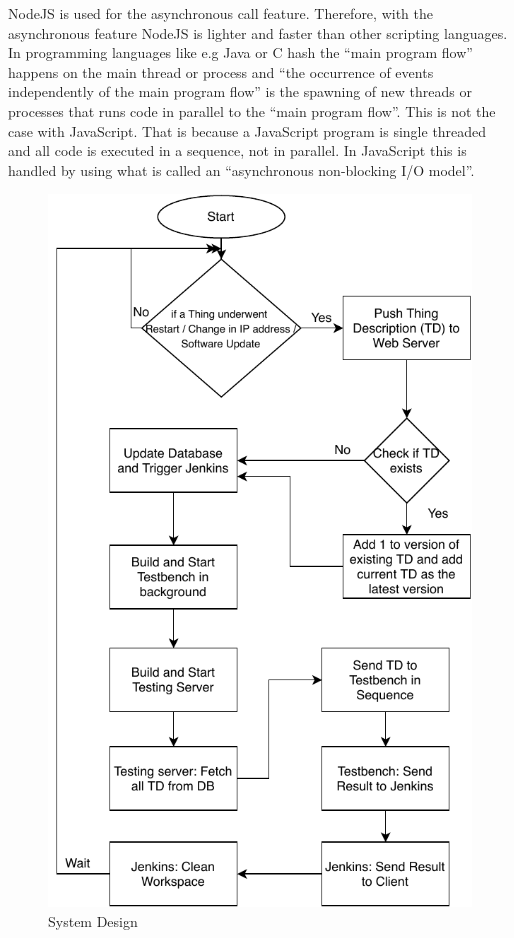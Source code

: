 \documentclass[conference]{IEEEtran}
\theoremstyle{definition}
\begin{document}
NodeJS is used for the asynchronous call feature. 
Therefore, with the asynchronous feature NodeJS is lighter and faster than other scripting languages. 
In programming languages like e.g Java or C hash the “main program flow” happens on the main thread or process and “the occurrence of events independently of the main program flow” is the spawning of new threads or processes that runs code in parallel to the “main program flow”. 
This is not the case with JavaScript. 
That is because a JavaScript program is single threaded and all code is executed in a sequence, not in parallel. 
In JavaScript this is handled by using what is called an “asynchronous non-blocking I/O model”.

\begin{figure}[t]
  \centerline{\includegraphics[scale=0.6]{SystemFlowChart} }
  
  \caption{System Design}
  \label{fig:System Flow Chart}
\end{figure}
\end{document}

